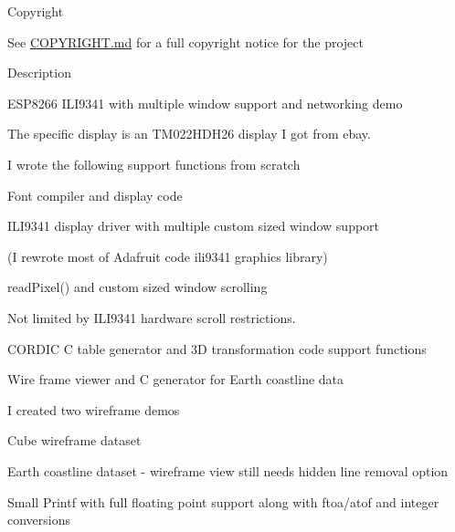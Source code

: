 \begin{DoxyParagraph}{Copyright}

\begin{DoxyItemize}
\item See \hyperlink{md_COPYRIGHT}{C\-O\-P\-Y\-R\-I\-G\-H\-T.md} for a full copyright notice for the project
\end{DoxyItemize}
\end{DoxyParagraph}
\begin{DoxyParagraph}{Description}

\begin{DoxyItemize}
\item E\-S\-P8266 I\-L\-I9341 with multiple window support and networking demo
\begin{DoxyItemize}
\item The specific display is an T\-M022\-H\-D\-H26 display I got from ebay.
\end{DoxyItemize}
\item I wrote the following support functions from scratch
\begin{DoxyItemize}
\item Font compiler and display code
\item I\-L\-I9341 display driver with multiple custom sized window support
\begin{DoxyItemize}
\item (I rewrote most of Adafruit code ili9341 graphics library)
\item read\-Pixel() and custom sized window scrolling
\item Not limited by I\-L\-I9341 hardware scroll restrictions.
\end{DoxyItemize}
\item C\-O\-R\-D\-I\-C C table generator and 3\-D transformation code support functions
\item Wire frame viewer and C generator for Earth coastline data
\begin{DoxyItemize}
\item I created two wireframe demos
\begin{DoxyItemize}
\item Cube wireframe dataset
\item Earth coastline dataset -\/ wireframe view still needs hidden line removal option
\end{DoxyItemize}
\end{DoxyItemize}
\item Small Printf with full floating point support along with ftoa/atof and integer conversions

\end{DoxyItemize}
\end{DoxyItemize}
\end{DoxyParagraph}
